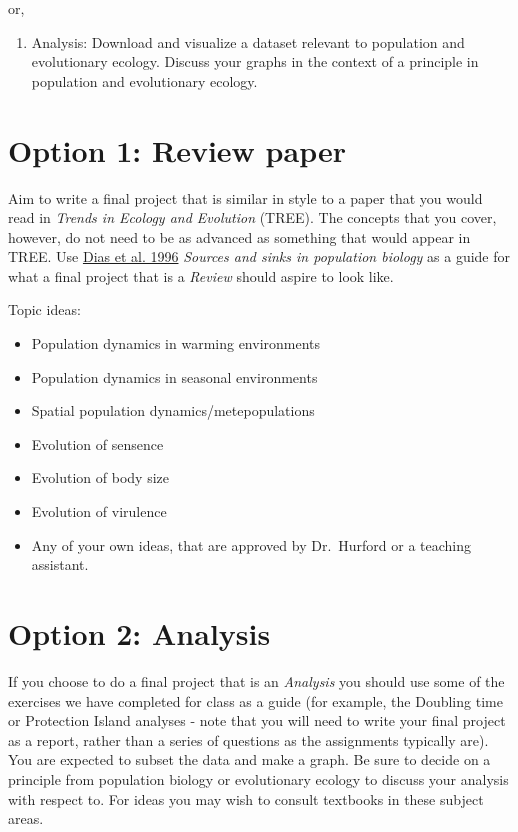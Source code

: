 \documentclass[]{book}
\providecommand{\tightlist}{%
  \setlength{\itemsep}{0pt}\setlength{\parskip}{0pt}}
\begin{document}
or,

\begin{enumerate}
\def\labelenumi{\arabic{enumi}.}
\setcounter{enumi}{1}
\tightlist
\item
  Analysis: Download and visualize a dataset relevant to population and
  evolutionary ecology. Discuss your graphs in the context of a
  principle in population and evolutionary ecology.
\end{enumerate}

\section{Option 1: Review paper}\label{option-1-review-paper}

Aim to write a final project that is similar in style to a paper that
you would read in \emph{Trends in Ecology and Evolution} (TREE). The
concepts that you cover, however, do not need to be as advanced as
something that would appear in TREE. Use
\href{https://www-sciencedirect-com.qe2a-proxy.mun.ca/science/article/pii/0169534796100379?via\%3Dihub}{Dias
et al. 1996} \emph{Sources and sinks in population biology} as a guide
for what a final project that is a \emph{Review} should aspire to look
like.

Topic ideas:

\begin{itemize}
\item
  Population dynamics in warming environments
\item
  Population dynamics in seasonal environments
\item
  Spatial population dynamics/metepopulations
\item
  Evolution of sensence
\item
  Evolution of body size
\item
  Evolution of virulence
\item
  Any of your own ideas, that are approved by Dr.~Hurford or a teaching
  assistant.
\end{itemize}

\section{Option 2: Analysis}\label{option-2-analysis}

If you choose to do a final project that is an \emph{Analysis} you
should use some of the exercises we have completed for class as a guide
(for example, the Doubling time or Protection Island analyses - note
that you will need to write your final project as a report, rather than
a series of questions as the assignments typically are). You are
expected to subset the data and make a graph. Be sure to decide on a
principle from population biology or evolutionary ecology to discuss
your analysis with respect to. For ideas you may wish to consult
textbooks in these subject areas.
\end{document}
